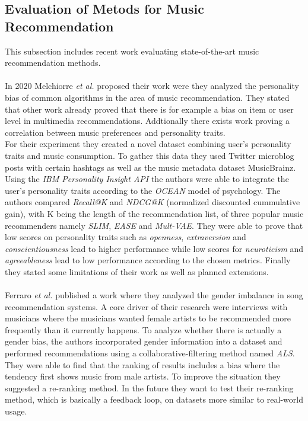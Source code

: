 \documentclass[runningheads,a4paper]{llncs}
\begin{document}
\subsection{Evaluation of Metods for Music Recommendation} 
This subsection includes recent work evaluating state-of-the-art music recommendation methods.\\
\\
In 2020 Melchiorre \textit{et al.} proposed their work were they analyzed the personality bias of common algorithms in the area of music recommendation.
They stated that other work already proved that there is for example a bias on item or user level in multimedia recommendations. 
Addtionally there exists work proving a correlation between music preferences and personality traits.\\
For their experiment they created a novel dataset combining user's personality traits and music consumption.
To gather this data they used Twitter microblog posts with certain hashtags as well as the music metadata dataset MusicBrainz. 
Using the \textit{IBM Personality Insight API} the authors were able to integrate the user's personality traits according to the \textit{OCEAN} model of psychology.
The authors compared \textit{Recall@K} and \textit{NDCG@K} (normalized discounted cummulative gain), with K being the length of the recommendation list, of three popular music recommenders namely \textit{SLIM}, \textit{EASE} and \textit{Mult-VAE}.
They were able to prove that low scores on personality traits such as \textit{openness}, \textit{extraversion} and \textit{conscientiousness} lead to higher performance
while low scores for \textit{neuroticism} and \textit{agreeableness} lead to low performance according to the chosen metrics. 
Finally they stated some limitations of their work as well as planned extensions. \cite{melchiorre2020personality}\\
\\
Ferraro \textit{et al.} published a work where they analyzed the gender imbalance in song recommendation systems. A core driver of 
their research were interviews with musicians where the musicians wanted female artists to be recommended more frequently than it currently happens.
To analyze whether there is actually a gender bias, the authors incorporated gender information into a dataset and
performed recommendations using a collaborative-filtering method named \textit{ALS}.
They were able to find that the ranking of results includes a bias where the tendency first shows music from male artists. 
To improve the situation they suggested a re-ranking method. In the future they want to test their re-ranking method, which is basically a feedback loop, on datasets more similar to real-world usage. \cite{ferraro2021break}\\
\end{document}
